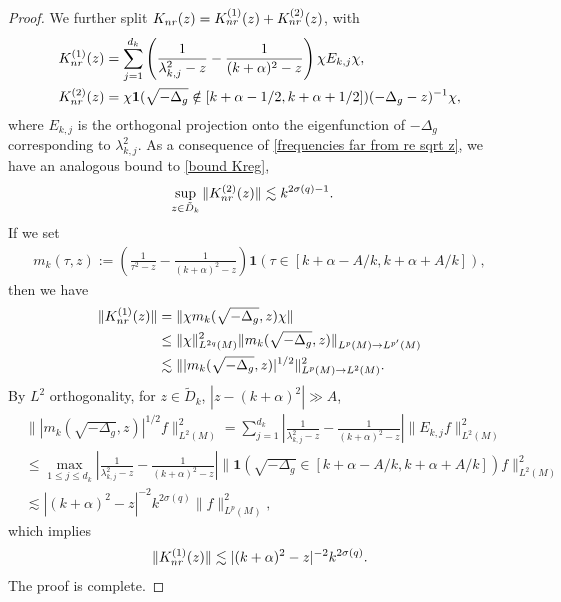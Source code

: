 \documentclass[10pt,a4paper]{amsart}
\begin{document}
\begin{proof}
 We further split $K_{\rm nr}(z)=K^{(1)}_{\rm nr}(z)+K^{(2)}_{\rm nr}(z)$, with
 \begin{align}
K^{(1)}_{\rm nr}(z)&=\sum_{j=1}^{d_k}\left(\frac{1}{\lambda_{k,j}^2-z}-\frac{1}{(k+\alpha)^2-z}\right)\chi E_{k,j}\chi,\\
 K^{(2)}_{\rm nr}(z)&=\chi\mathbf{1}(\sqrt{-\Delta_g}\notin[k+\alpha-1/2,k+\alpha+1/2])(-\Delta_g-z)^{-1}\chi,   
\end{align}
where $E_{k,j}$ is the orthogonal projection onto the eigenfunction of $-\Delta_g$ corresponding to $\lambda_{k,j}^2$.
As a consequence of \eqref{frequencies far from re sqrt z}, we have an analogous bound to \eqref{bound Kreg},
\begin{align}\label{bound K^2_nr}
    \sup_{z\in \tilde{D}_k}\|K^{(2)}_{\rm nr}(z)\|&\lesssim k^{2\sigma(q)-1}.
\end{align}
If we set
\begin{align}
   m_k(\tau,z):=\left(\frac{1}{\tau^2-z}-\frac{1}{(k+\alpha)^2-z}\right)\mathbf{1}(\tau\in [k+\alpha-A/k,k+\alpha+  A/k]),
   \end{align}
then we have
\begin{align}
 \|K^{(1)}_{\rm nr}(z)\|&=\|\chi m_k(\sqrt{-\Delta
_g},z)\chi\|\\
&\leq \|\chi\|^2_{L^{2q}(M)}\|m_k(\sqrt{-\Delta
_g},z)\|_{L^p(M)\to L^{p'}(M)}\\
&\lesssim \||m_k(\sqrt{-\Delta
_g},z)|^{1/2}\|_{L^p(M)\to L^{2}(M)}^2.
\end{align}
By $L^2$ orthogonality, for $z\in \tilde{D}_k$, $|z-(k+\alpha)^2|\gg A$,
\begin{align}
&\||m_k(\sqrt{-\Delta_g},z)|^{1/2}f\|_{L^{2}(M)}^2 
=\sum_{j=1}^{d_k}\left|\frac{1}{\lambda_{k,j}^2-z}-\frac{1}{(k+\alpha)^2-z}\right| \|E_{k,j}f\|_{L^{2}(M)}^2\\
&\leq \max_{1\leq j\leq d_k}\left|\frac{1}{\lambda_{k,j}^2-z}-\frac{1}{(k+\alpha)^2-z}\right| \|\mathbf{1}(\sqrt{-\Delta_g}\in[k+\alpha-A/k,k+\alpha+  A/k])f\|_{L^{2}(M)}^2\\
&\lesssim |(k+\alpha)^2-z|^{-2}k^{2\sigma(q)}\|f\|_{L^{p}(M)}^2,
\end{align}
which implies
\begin{align}\label{bound K^1_nr}
   \|K^{(1)}_{\rm nr}(z)\|\lesssim |(k+\alpha)^2-z|^{-2}k^{2\sigma(q)}.
\end{align}   
The proof is complete.
\end{proof}
\end{document}
